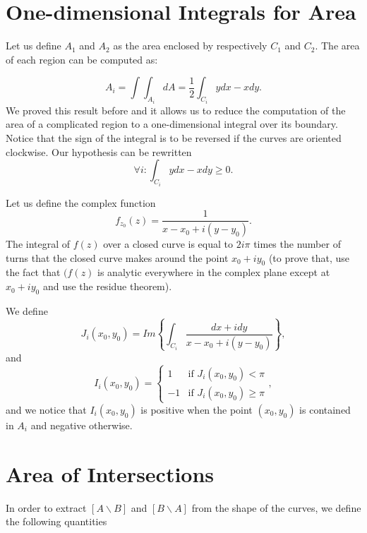 \documentclass{article}
\begin{document}
\section{One-dimensional Integrals for Area}

Let us define $A_1$ and $A_2$ as the area enclosed by respectively $C_1$ and $C_2$. The area of each region can be computed as:

\begin{equation}
  A_i = \int \! \! \! \int _{A_i} dA = \frac{1}{2} \int _{C_i} y dx - x dy .
\end{equation} We proved this result before and it allows us to reduce the computation of the area of a complicated region to a one-dimensional integral over its boundary.
Notice that the sign of the integral is to be reversed if the curves are oriented clockwise. Our hypothesis can be rewritten
\begin{equation}
\forall i : \int _{C_i} y dx - x dy \ge 0 .
\end{equation}

Let us define the complex function 
\begin{equation}
f_{z_0}(z) = \frac{1}{x-x_0+i(y-y_0)} .
\end{equation} The integral of $f(z)$ over a closed curve is equal to $2i\pi $ times the number of turns that the closed curve makes around the point $x_0 + i y_0$ (to prove that, use the fact that $(f(z)$ is analytic everywhere in the complex plane except at $x_0 + i y_0$ and use the residue theorem).

We define
\begin{equation}
J_i (x_0, y_0) = Im \left\{ \int _{C_i} \frac{dx+i dy}{x-x_0+i(y-y_0)} \right\} ,
\end{equation} and
\begin{equation}
I_i (x_0, y_0) =\left\{
\begin{array}{cl}
1 & \text{if } J_i (x_0, y_0) < \pi\\
-1 & \text{if } J_i (x_0, y_0) \ge \pi
\end{array}
\right. ,
\end{equation} and we notice that $I_i (x_0, y_0) $ is positive when the point $(x_0, y_0)$ is contained in $A_i$ and negative otherwise.


\section{Area of Intersections}

In order to extract $[A\backslash B]$ and $[B\backslash A]$ from the shape of the curves, we define the following quantities
\end{document}
